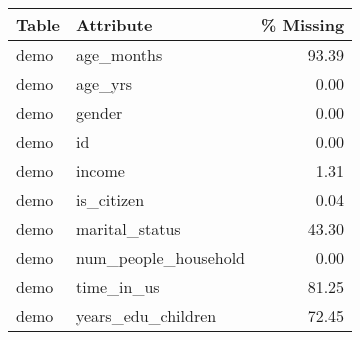 \begin{tabular}{llr}
\toprule
 \textbf{Tabl}e &                \textbf{Attribute} &  \textbf{\% Missing} \\
\midrule
  demo &               age\_months &      93.39 \\
  demo &                  age\_yrs &       0.00 \\
  demo &                   gender &       0.00 \\
  demo &                       id &       0.00 \\
  demo &                   income &       1.31 \\
  demo &               is\_citizen &       0.04 \\
  demo &           marital\_status &      43.30 \\
  demo &     num\_people\_household &       0.00 \\
  demo &               time\_in\_us &      81.25 \\
  demo &       years\_edu\_children &      72.45 \\
\bottomrule
\end{tabular}
